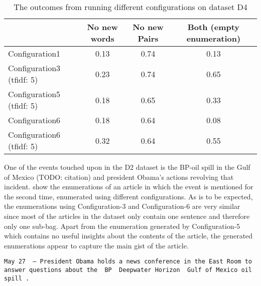 \begin{center}
\begin{table}
  \begin{tabular}{|l|c|c|c|}
    \hline
    &  No new words & No new Pairs & Both (empty enumeration) \\ \hline
    Configuration1                    & 0.13  & 0.74  & 0.13 \\ \hline
    Configuration3 (tfidf: 5)         & 0.23  & 0.74  & 0.65 \\ \hline
    Configuration5 (tfidf: 5)         & 0.18  & 0.65  & 0.33 \\ \hline
    Configuration6                    & 0.18  & 0.64  & 0.08 \\ \hline
    Configuration6 (tfidf: 5)         & 0.32  & 0.64  & 0.55 \\ \hline
  \end{tabular}
  \caption{The outcomes from running different configurations on dataset D4}
  \label{tab:d4}
\end{table}
\end{center}

One of the events touched upon in the D2 dataset is the BP-oil spill in the Gulf of Mexico (TODO: citation) and president Obama's actions revolving that incident.  show the enumerations of an article in which the event is mentioned for the second time, enumerated using different configurations. As is to be expected, the enumerations using Configuration-3 and Configuration-6 are very similar since most of the articles in the dataset only contain one sentence and therefore only one sub-bag. Apart from the enumeration generated by Configuration-5 which contains no useful insights about the contents of the article, the generated enumerations appear to capture the main gist of the article.

\begin{lstlisting}[caption=Original text,
    label={lst:original},
  ]
  May 27  – President Obama holds a news conference in the East Room to answer questions about the  BP  Deepwater Horizon  Gulf of Mexico oil spill . 
\end{lstlisting}


